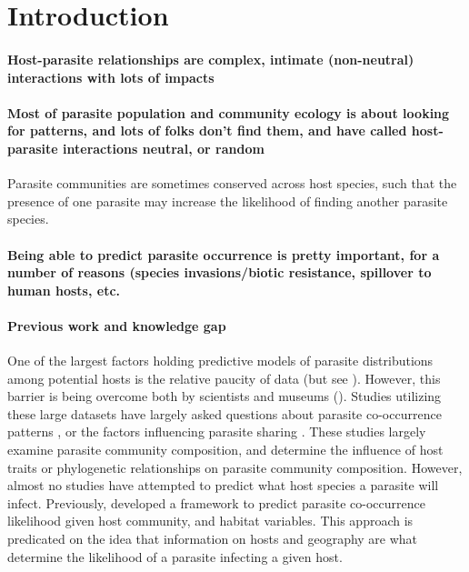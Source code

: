 \documentclass[12pt]{article}
\begin{document}
\section*{Introduction}
 \paragraph{Host-parasite relationships are complex, intimate (non-neutral) interactions with lots of impacts}
 
 
 \paragraph{Most of parasite population and community ecology is about looking for patterns, and lots of folks don't find them, and have called host-parasite interactions neutral, or random}
 Parasite communities are sometimes conserved across host species, such that the presence of one parasite may increase the likelihood of finding another parasite species.
 
 
 
 
 \paragraph{Being able to predict parasite occurrence is pretty important, for a number of reasons (species invasions/biotic resistance, spillover to human hosts, etc.}
 
 
 
 
 
 \paragraph{Previous work and knowledge gap}
  One of the largest factors holding predictive models of parasite distributions among potential hosts is the relative paucity of data (but see \cite{}). However, this barrier is being overcome both by scientists \cite{strona2012, nunn2005} and museums (\cite{gibson2005}). Studies utilizing these large datasets have largely asked questions about parasite co-occurrence patterns \cite{strona2013}, or the factors influencing parasite sharing \cite{braga2014, dallas2014b}. These studies largely examine parasite community composition, and determine the influence of host traits or phylogenetic relationships on parasite community composition. However, almost no studies have attempted to predict what host species a parasite will infect. Previously, \citet{strona2013} developed a framework to predict parasite co-occurrence likelihood given host community, and habitat variables. This approach is predicated on the idea that information on hosts and geography are what determine the likelihood of a parasite infecting a given host. 
\end{document}
